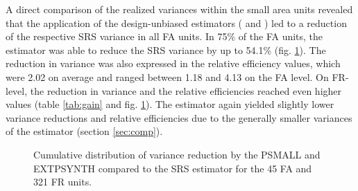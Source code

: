A direct comparison of the realized variances within the small area units revealed that the application of the design-unbiased estimators (\psmall{} and \extpsynth{}) led to a reduction of the respective SRS variance in all FA units. In 75\% of the FA units, the \extpsynth{} estimator was able to reduce the SRS variance by up to 54.1\% (fig. \ref{fig:gain}). The reduction in variance was also expressed in the relative efficiency values, which were 2.02 on average and ranged between 1.18 and 4.13 on the FA level. On FR-level, the reduction in variance and the relative efficiencies reached even higher values (table \ref{tab:gain} and fig. \ref{fig:gain}). The \psmall{} estimator again yielded slightly lower variance reductions and relative efficiencies due to the generally smaller variances of the \extpsynth{} estimator (section \ref{sec:comp}).

\begin{figure}[H]
	\centering
	\caption{Cumulative distribution of variance reduction by the PSMALL and EXTPSYNTH compared to the SRS estimator for the  45 FA and 321 FR units.}
	\label{fig:gain}
\end{figure}

